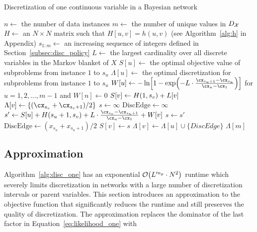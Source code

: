 \begin{algorithm}
  \caption{Discretization of one continuous variable in a Bayesian network}
  \label{alg:disc_one}
  \begin{algorithmic}[5]
      \State $n \leftarrow$ the number of data instances
      \State $m \leftarrow$ the number of unique values in $D_{\mathcal{X}}$
      \State $H \leftarrow$ an $N \times N$ matrix such that $H[u,v] = h(u,v)$ (see Algorithm~\ref{alg:h} in Appendix)
      \State $s_{1:m} \leftarrow$ an increasing sequence of integers defined in Section~\ref{subsec:disc_policy}
      \State $L \leftarrow$ the largest cardinality over all discrete variables in the Markov blanket of $X$
      \State $S[u] \leftarrow$ the optimal objective value of subproblems from instance $1$ to $s_u$
      \State $\Lambda[u] \leftarrow$ the optimal discretization for subproblems from instance $1$ to $s_u$
      \State $W[u]  \leftarrow - \ln\brock{1 - {\exp\paren{- L \cdot{ {{\cx_{s_u+1} - \cx_{s_u}}\over{\cx_n - \cx_1}}}}}}$ for $u = 1,2, \ldots,m-1$ and $W[n] \leftarrow 0$
          \State $S[v] \leftarrow H \paren{1,s_v} + L[v]$
          \State $\Lambda[v] \leftarrow \{ ({\cx_{s_v} + \cx_{s_v+1}}) / 2\}$
        \Else
          \State $s \leftarrow \infty$
          \State $\text{DiscEdge} \leftarrow \infty$
        \State $s' \leftarrow S[u] + H \paren{s_u+1, s_v} +  {L \cdot {\frac{\cx_{s_v} - \cx_{s_u + 1}}{\cx_n - \cx_1}}} + W[v]$
          \State $s \leftarrow s'$
          \State $\text{DiscEdge} \leftarrow ({x_{s_u} + x_{s_u+1}}) / 2$
        \EndIf
        \EndFor
          \State $S[v] \leftarrow s$
          \State $\Lambda[v] \leftarrow \Lambda[u] \cup \{ DiscEdge \}$
        \EndIf
      \EndFor
      \State \Return $\Lambda[m]$
    \EndFunction
  \end{algorithmic}
\end{algorithm}


\subsection{Approximation}

Algorithm~\ref{alg:disc_one} has an exponential $\bigo\paren{L'^{n_p} \cdot N^2}$ runtime which severely limits discretization in networks with a large number of discretization intervals or parent variables.
This section introduces an approximation to the objective function that significantly reduces the runtime and still preserves the quality of discretization.
The approximation replaces the dominator of the last factor in Equation~\ref{eq:likelihood_one} with

